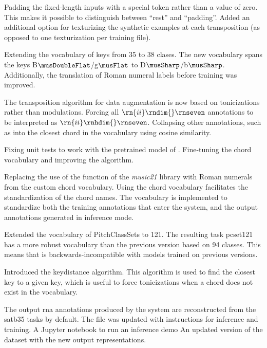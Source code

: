 Padding the fixed-length inputs with a special token rather
than a value of zero. This makes it possible to distinguish
between ``rest'' and ``padding''. Added an additional option
for texturizing the synthetic examples at each transposition
(as opposed to one texturization per training file).

Extending the vocabulary of keys from 35 to 38 clases. The
new vocabulary spans the keys B$\musDoubleFlat$/g$\musFlat$
to D$\musSharp$/b$\musSharp$. Additionally, the translation
of Roman numeral labels before training was improved.

The transposition algorithm for data augmentation is now
based on tonicizations rather than modulations. Forcing all
$\rn{ii}\rndim{}\rnseven$ annotations to be interpreted as
$\rn{ii}\rnhdim{}\rnseven$. Collapsing other annotations,
such as  into the closest chord in the vocabulary
using cosine similarity.

Fixing unit tests to work with the pretrained model of
. Fine-tuning the chord vocabulary and
improving the  algorithm.

Replacing the use of the 
function of the \emph{music21}
\parencite{cuthbert2010music21} library with Roman numerals
from the custom chord vocabulary. Using the chord vocabulary
facilitates the standardization of the chord names. The
vocabulary is implemented to standardize both the training
annotations that enter the system, and the output
annotations generated in inference mode.

Extended the vocabulary of PitchClassSets to 121. The
resulting task \gls{pcset121} has a more robust vocabulary
than the previous version based on 94 classes. This means
that  is backwards-incompatible with models
trained on previous versions.


Introduced the keydistance algorithm. This algorithm is used
to find the closest key to a given key, which is useful to
force tonicizations when a chord does not exist in the
vocabulary.

The output \gls{rna} annotations produced by the system are
reconstructed from the \gls{satb35} tasks by default. The
 file was updated with instructions for
inference and training. A Jupyter notebook
\textcite{kluyver2016jupyter} to run an inference demo An
updated version of the dataset with the new output
representations.


